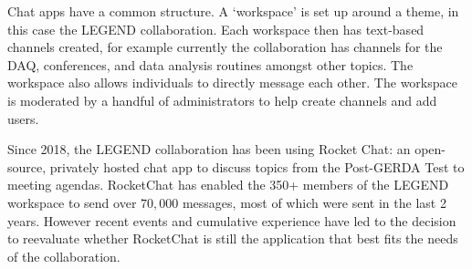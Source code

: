 \documentclass[11pt,letterpaper]{article}
\begin{document}
Chat apps have a common structure. A `workspace' is set up around a theme, in this case the LEGEND collaboration. Each workspace then has text-based channels created, for example currently the collaboration has channels for the DAQ, conferences, and data analysis routines amongst other topics. The workspace also allows individuals to directly message each other. The workspace is moderated by a handful of administrators to help create channels and add users. 

Since 2018, the LEGEND collaboration has been using Rocket Chat: an open-source, privately hosted chat app to discuss topics from the Post-GERDA Test to meeting agendas. RocketChat has enabled the 350+ members of the LEGEND workspace to send over $70,000$ messages, most of which were sent in the last 2 years. 
However recent events and cumulative experience have led to the decision to reevaluate whether RocketChat is still the application that best fits the needs of the collaboration. 
\end{document}
